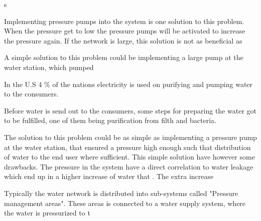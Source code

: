 s


Implementing pressure pumps into the system is one solution to this problem. When the pressure get to low the pressure pumps will be activated to increase the pressure again. If the network is large, this solution is not as beneficial as 

A simple solution to this problem could be implementing a large pump at the water station, which pumped

In the U.S 4 \% of the nations electricity is used on purifying and pumping water to the consumers. 

Before water is send out to the consumers, some steps for preparing the water got to be fulfilled, one of them being purification from filth and bacteria.  




The solution to this problem could be as simple as implementing a pressure pump at the water station, that ensured a pressure high enough such that distribution of water to the end user where sufficient. This simple solution have however some drawbacks. The pressure in the system have a direct correlation to water leakage which end up in a higher increase of water that . The extra increase 


Typically the water network is distributed into sub-systems called "Pressure management areas". These areas is connected to a water supply system, where the water is pressurized to t  





